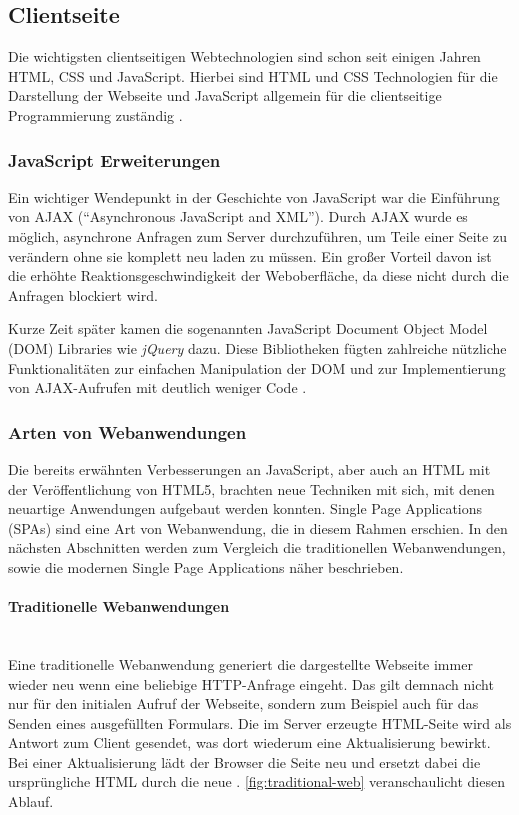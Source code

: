 \subsection{Clientseite}
Die wichtigsten clientseitigen Webtechnologien sind schon seit einigen Jahren HTML, CSS und JavaScript. Hierbei sind HTML und CSS Technologien für die Darstellung der Webseite und JavaScript allgemein für die clientseitige Programmierung zuständig \cite{Thattil2016}.

\subsubsection{JavaScript Erweiterungen}
Ein wichtiger Wendepunkt in der Geschichte von JavaScript war die Einführung von \acs{AJAX} (\enquote{Asynchronous JavaScript and XML}). Durch AJAX wurde es möglich, asynchrone Anfragen zum Server durchzuführen, um Teile einer Seite zu verändern ohne sie komplett neu laden zu müssen. Ein großer Vorteil davon ist die erhöhte Reaktionsgeschwindigkeit der Weboberfläche, da diese nicht durch die Anfragen blockiert wird.

Kurze Zeit später kamen die sogenannten JavaScript Document Object Model (\acs{DOM}) Libraries wie \textit{jQuery} dazu. Diese Bibliotheken fügten zahlreiche nützliche Funktionalitäten zur einfachen Manipulation der DOM und zur Implementierung von AJAX-Aufrufen mit deutlich weniger Code \cite{Fink2014}.

\subsubsection{Arten von Webanwendungen}\label{web_types}
Die bereits erwähnten Verbesserungen an JavaScript, aber auch an HTML mit der Veröffentlichung von HTML5, brachten neue Techniken mit sich, mit denen neuartige Anwendungen aufgebaut werden konnten. Single Page Applications (\acs{SPA}s) sind eine Art von Webanwendung, die in diesem Rahmen erschien. In den nächsten Abschnitten werden zum Vergleich die traditionellen Webanwendungen, sowie die modernen Single Page Applications näher beschrieben.

\paragraph{Traditionelle Webanwendungen}$\;$ \\
Eine traditionelle Webanwendung generiert die dargestellte Webseite immer wieder neu wenn eine beliebige HTTP-Anfrage eingeht. Das gilt demnach nicht nur für den initialen Aufruf der Webseite, sondern zum Beispiel auch für das Senden eines ausgefüllten Formulars. Die im Server erzeugte HTML-Seite wird als Antwort zum Client gesendet, was dort wiederum eine Aktualisierung bewirkt. Bei einer Aktualisierung lädt der Browser die Seite neu und ersetzt dabei die ursprüngliche HTML durch die neue \cite{Fink2014}. \cref{fig:traditional-web} veranschaulicht diesen Ablauf.

